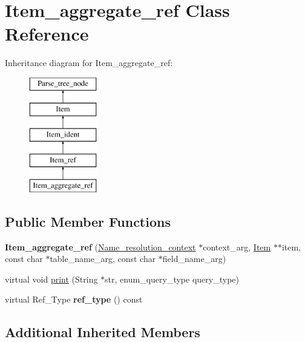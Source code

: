 \hypertarget{classItem__aggregate__ref}{}\section{Item\+\_\+aggregate\+\_\+ref Class Reference}
\label{classItem__aggregate__ref}
Inheritance diagram for Item\+\_\+aggregate\+\_\+ref\+:\begin{figure}[H]
\begin{center}
\leavevmode
\includegraphics[height=5.000000cm]{classItem__aggregate__ref}
\end{center}
\end{figure}
\subsection*{Public Member Functions}
\begin{DoxyCompactItemize}
\item 
\mbox{\label{classItem__aggregate__ref_a1c34671b26b2dc33366e83cf9247e593}} 
{\bfseries Item\+\_\+aggregate\+\_\+ref} (\mbox{\hyperlink{structName__resolution__context}{Name\+\_\+resolution\+\_\+context}} $\ast$context\+\_\+arg, \mbox{\hyperlink{classItem}{Item}} $\ast$$\ast$item, const char $\ast$table\+\_\+name\+\_\+arg, const char $\ast$field\+\_\+name\+\_\+arg)
\item 
virtual void \mbox{\hyperlink{classItem__aggregate__ref_ae6a411b0088c79b64443138fcc3625ba}{print}} (String $\ast$str, enum\+\_\+query\+\_\+type query\+\_\+type)
\item 
\mbox{\label{classItem__aggregate__ref_ae91456cfe94f947eb7a8ea68d863cef3}} 
virtual Ref\+\_\+\+Type {\bfseries ref\+\_\+type} () const
\end{DoxyCompactItemize}
\subsection*{Additional Inherited Members}


